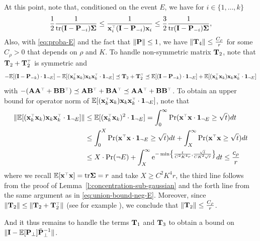 \documentclass{article}
\begin{document}
\medskip

At this point, note that, conditioned on the event $E$, we have for $i \in \{1, \ldots, k \}$
\begin{equation}
    \frac12 \frac1{\tr (\I - \P_{-i}) \Sigmab} \le \frac1{\x_i^\top (\I - \P_{-i}) \x_i} \le \frac32 \frac1{\tr (\I - \P_{-i}) \Sigmab}, %
\end{equation}
Also, with \eqref{eq:proba-E} and the fact that $\| \P \| \le 1$, we have $ \| \T_4 \| \le
\frac{C_\rho}{r}$ for some $C_\rho > 0$ that depends on $\rho$ and $K$. To handle non-symmetric matrix $\T_2$, note that $\T_2 + \T_2^\top$ is symmetric and
\begin{equation}
  - \E[ (\I - \P_{-k}) \cdot \one_{\neg E}] - \E[ (\x_k^\top \x_k) \x_k\x_k^\top \cdot \one_{\neg E}] \preceq \T_2 + \T_2^\top \preceq \E[ (\I - \P_{-k}) \cdot \one_{\neg E}] + \E[ (\x_k^\top \x_k) \x_k\x_k^\top \cdot \one_{\neg E}]
\end{equation}
with $-(\A \A^\top + \B \B^\top) \preceq \A \B^\top + \B \A^\top \preceq \A \A^\top + \B \B^\top$. To obtain an upper bound for operator norm of $\E[ (\x_k^\top \x_k) \x_k\x_k^\top \cdot \one_{\neg E}]$, note that 
\begin{align*}
  \| \E[ (\x_k^\top \x_k) \x_k\x_k^\top \cdot \one_{\neg E}] \| &\le \E[ (\x_k^\top \x_k)^2 \cdot \one_{\neg E}] = \int_0^\infty \Pr ( \x^\top \x \cdot \one_{\neg E} \ge \sqrt t ) dt \\ 
  &\le \int_0^X \Pr ( \x^\top \x \cdot \one_{\neg E} \ge \sqrt t ) dt + \int_X^\infty \Pr ( \x^\top \x \ge \sqrt t ) dt  \\ 
  &\le X \cdot \Pr(\neg E) + \int_X^\infty \ee^{- \min \left\{ \frac{t}{C^2 K^4 r}, \frac{\sqrt t}{CK^2 \sqrt r} \right\} } dt \le \frac{c_\rho}r
\end{align*}
where we recall $\E[\x^\top \x] = \tr \Sigmab = r$ and take $X \ge C^2 K^4 r$, the third line follows from the proof of Lemma~\ref{l:concentration-sub-gaussian} and the forth line from the same argument as in \eqref{eq:union-bound-neg-E}. Moreover, since $\| \T_2 \| \le \| \T_2 + \T_2^\top \|$ (see for example \cite[Proposition~5.11]{serre2010matrices}), we conclude that $\| \T_2 \| \le \frac{C_\rho}r$.


And it thus remains to handle the terms $\T_1$ and $\T_3$ to obtain a bound on $\| \I - \E[\P_\perp] \bar \P_\perp^{-1} \| $. 
\end{document}
